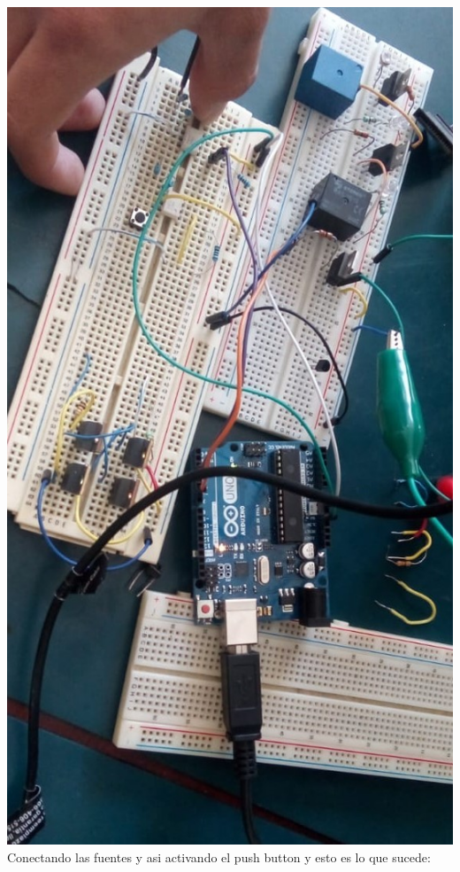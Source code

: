 \documentclass[10pt,a4paper]{article}
\begin{document}
\centering
\includegraphics[scale=0.3]{6.jpeg}\\


Conectando las fuentes y asi activando el push button y esto es lo que sucede: \\
\end{document}
